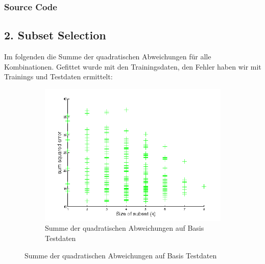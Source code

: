 \documentclass{article}
\begin{document}
	\subsubsection*{Source Code}
	


\subsection*{2. Subset Selection}

	Im folgenden die Summe der quadratischen Abweichungen für alle Kombinationen. Gefittet wurde mit den Trainingsdaten, den Fehler haben wir mit Trainings und Testdaten ermittelt:
	\begin{figure}[H]
	  \begin{subfigure}
	    \centering
	    \includegraphics[scale=0.7,bb=0 0 576 432]{task2-sum-sq-errors-tes.png}
		\caption{Summe der quadratischen Abweichungen auf Basis Testdaten}
	  \end{subfigure}
	\end{figure}
\end{document}
